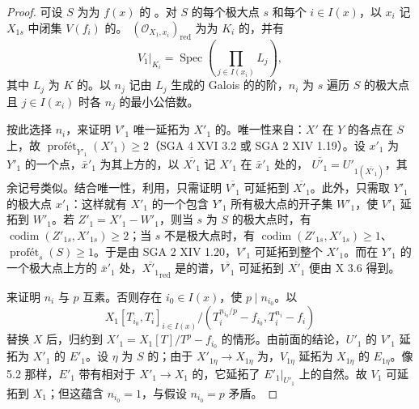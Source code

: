 \begin{proof}
可设 $S$ 为为 $f(x)$ 的 。对 $S$ 的每个极大点 $s$ 和每个 $i\in I(x)$，以 $x_i$ 记 $X_{1s}$ 中闭集 $V(f_i)$ 的。 $(\mathcal O_{X_1,x_i})_{\mathrm{red}}$ 为为 $K_i$ 的，并有
\[V_1|_{K_i}=\operatorname{Spec}\left(\prod_{j\in I(x_i)}L_j\right),\]
其中 $L_j$ 为 $K$ 的。以 $n_j$ 记由 $L_j$ 生成的 Galois 的的阶，$n_i$ 为 $s$ 遍历 $S$ 的极大点且 $j\in I(x_i)$ 时各 $n_j$ 的最小公倍数。

按此选择 $n_i$，来证明 $V'_1$ 唯一延拓为 $X'_1$ 的。唯一性来自：$X'$ 在 $Y$ 的各点在 $S$ 上，故 $\operatorname{prof\text{ét}}_{Y'_1}(X'_1)\geq2$（SGA 4 XVI 3.2 或 SGA 2 XIV 1.19）。设 $x'_1$ 为 $Y'_1$ 的一个点，$\bar x'_1$ 为其上方的，以 $\overline{X'_1}$ 记 $X'_1$ 在 $\bar x'_1$ 处的，
$\overline{U'_1}=U'_{1(\overline{X'_1})}$，其余记号类似。结合唯一性，利用，只需证明 $\overline{V'_1}$ 可延拓到 $\overline{X'_1}$。此外，只需取 $Y'_1$ 的极大点 $x'_1$：这样就有 $X'_1$ 的一个包含 $Y'_1$ 所有极大点的开子集 $W'_1$，使 $V'_1$ 延拓到 $W'_1$。若 $Z'_1=X'_1-W'_1$，则当 $s$ 为 $S$ 的极大点时，有 $\operatorname{codim}(Z'_{1s},X'_{1s})\geq2$；当 $s$ 不是极大点时，有 $\operatorname{codim}(Z'_{1s},X'_{1s})\geq1$、$\operatorname{prof\text{ét}}_s(S)\geq1$。于是由 SGA 2 XIV 1.20，$V'_1$ 可延拓到整个 $X'_1$。而在 $Y'_1$ 的一个极大点上方的 $\bar x'_1$ 处，$\overline{X'_1}_{\mathrm{red}}$ 是的谱，$\overline{V'_1}$ 可延拓到 $\overline{X'_1}$ 便由 X 3.6 得到。

来证明 $n_i$ 与 $p$ 互素。否则存在 $i_0\in I(x)$，使 $p\mid n_{i_0}$。以
\[X_1[T_{i_0},T_i]_{i\in I(x)}/(T_i^{n_{i_0}/p}-f_{i_0},T_i^{n_i}-f_i)\]
替换 $X$ 后，归约到 $X'_1=X_1[T]/T^p-f_{i_0}$ 的情形。由前面的结论，$U'_1$ 的 $V'_1$ 延拓为 $X'_1$ 的 $E'_1$。设 $\eta$ 为 $S$ 的；由于 $X'_{1\eta}\to X_{1\eta}$ 为，$V_{1\eta}$ 延拓为 $X_{1\eta}$ 的 $E_{1\eta}$。像 5.2 那样，$E'_1$ 带有相对于 $X'_1\to X_1$ 的，它延拓了 $E'_1|_{U'_1}$ 上的自然。故 $V_1$ 可延拓到 $X_1$；但这蕴含 $n_{i_0}=1$，与假设 $n_{i_0}=p$ 矛盾。
\end{proof}

